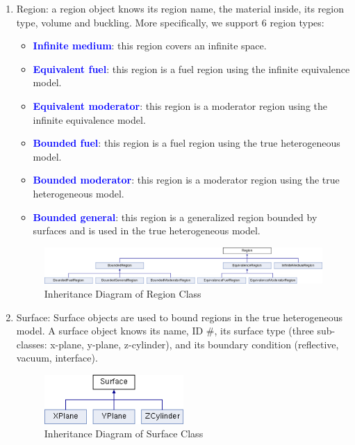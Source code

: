 \documentclass[titlepage]{article}
\newcommand{\hi}[1]{\textbf{\textcolor{blue}{#1}}}
\begin{document}
\begin{enumerate}
\item Region: a region object knows its region name, the material inside, its region type, volume and buckling. More specifically, we support 6 region types: 
  \begin{itemize}
    \item \hi{Infinite medium}: this region covers an infinite space. 
    \item \hi{Equivalent fuel}: this region is a fuel region using the infinite equivalence model. 
    \item \hi{Equivalent moderator}: this region is a moderator region using the infinite equivalence model. 
    \item \hi{Bounded fuel}: this region is a fuel region using the true heterogeneous model. 
    \item \hi{Bounded moderator}: this region is a moderator region using the true heterogeneous model. 
    \item \hi{Bounded general}: this region is a generalized region bounded by surfaces and is used in the true heterogeneous model. 
  \end{itemize}
  \begin{figure}[h]
    \hspace{-1in}
    \includegraphics[width=1.5\textwidth]{images/classRegion.png}
    \caption{Inheritance Diagram of Region Class} \label{classRegion}
  \end{figure}



\item Surface: Surface objects are used to bound regions in the true heterogeneous model. A surface object knows its name, ID \#, its surface type (three sub-classes: x-plane, y-plane, z-cylinder), and its boundary condition (reflective, vacuum, interface). 
  \begin{figure}[h]
    \centering
    \includegraphics[width=0.5\textwidth]{images/classSurface.png}
    \caption{Inheritance Diagram of Surface Class}
  \end{figure}



\end{enumerate}
\end{document}
